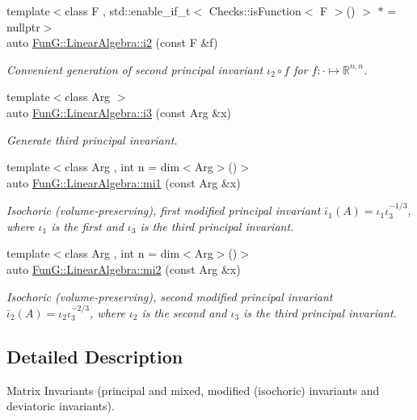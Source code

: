 \begin{DoxyCompactItemize}
{\footnotesize template$<$class F , std\-::enable\-\_\-if\-\_\-t$<$ Checks\-::is\-Function$<$ F $>$() $>$ $\ast$  = nullptr$>$ }\\auto \hyperlink{group__InvariantGroup_gad3987f97353c8696e602ed1915b3cf47}{Fun\-G\-::\-Linear\-Algebra\-::i2} (const F \&f)
\begin{DoxyCompactList}\small\item\em Convenient generation of second principal invariant $ \iota_2\circ f $ for $f:\cdot\mapsto\mathbb{R}^{n,n}$. \end{DoxyCompactList}\item 
{\footnotesize template$<$class Arg $>$ }\\auto \hyperlink{group__InvariantGroup_gae1ad80b4b2f34a10564114fad28bc313}{Fun\-G\-::\-Linear\-Algebra\-::i3} (const Arg \&x)
\begin{DoxyCompactList}\small\item\em Generate third principal invariant. \end{DoxyCompactList}\item 
{\footnotesize template$<$class Arg , int n = dim$<$\-Arg$>$()$>$ }\\auto \hyperlink{group__InvariantGroup_ga7eed5e2661171d81e192ac1db791244c}{Fun\-G\-::\-Linear\-Algebra\-::mi1} (const Arg \&x)
\begin{DoxyCompactList}\small\item\em Isochoric (volume-\/preserving), first modified principal invariant $ \bar\iota_1(A)=\iota_1\iota_3^{-1/3} $, where $\iota_1$ is the first and $\iota_3$ is the third principal invariant. \end{DoxyCompactList}\item 
{\footnotesize template$<$class Arg , int n = dim$<$\-Arg$>$()$>$ }\\auto \hyperlink{group__InvariantGroup_ga9d219c5c48cce1d3af60345916963524}{Fun\-G\-::\-Linear\-Algebra\-::mi2} (const Arg \&x)
\begin{DoxyCompactList}\small\item\em Isochoric (volume-\/preserving), second modified principal invariant $ \bar\iota_2(A)=\iota_2\iota_3^{-2/3} $, where $\iota_2$ is the second and $\iota_3$ is the third principal invariant. \end{DoxyCompactList}\end{DoxyCompactItemize}


\subsection{Detailed Description}
Matrix Invariants (principal and mixed, modified (isochoric) invariants and deviatoric invariants). 

